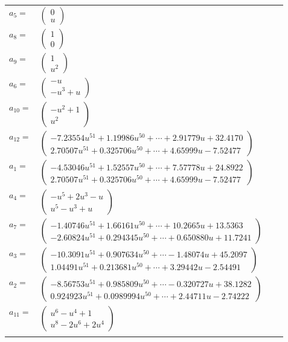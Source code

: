 \documentclass[1p]{elsarticle_modified}
\theoremstyle{definition}
\begin{document}
\begin{tabular}{m{7pt} m{180pt} m{7pt} m{180pt} }
\flushright $a_{5}=$&$\begin{pmatrix}0\\u\end{pmatrix}$ \\
\flushright $a_{8}=$&$\begin{pmatrix}1\\0\end{pmatrix}$ \\
\flushright $a_{9}=$&$\begin{pmatrix}1\\u^2\end{pmatrix}$ \\
\flushright $a_{6}=$&$\begin{pmatrix}- u\\- u^3+u\end{pmatrix}$ \\
\flushright $a_{10}=$&$\begin{pmatrix}- u^2+1\\u^2\end{pmatrix}$ \\
\flushright $a_{12}=$&$\begin{pmatrix}-7.23554 u^{51}+1.19986 u^{50}+\cdots+2.91779 u+32.4170\\2.70507 u^{51}+0.325706 u^{50}+\cdots+4.65999 u-7.52477\end{pmatrix}$ \\
\flushright $a_{1}=$&$\begin{pmatrix}-4.53046 u^{51}+1.52557 u^{50}+\cdots+7.57778 u+24.8922\\2.70507 u^{51}+0.325706 u^{50}+\cdots+4.65999 u-7.52477\end{pmatrix}$ \\
\flushright $a_{4}=$&$\begin{pmatrix}- u^5+2 u^3- u\\u^5- u^3+u\end{pmatrix}$ \\
\flushright $a_{7}=$&$\begin{pmatrix}-1.40746 u^{51}+1.66161 u^{50}+\cdots+10.2665 u+13.5363\\-2.60824 u^{51}+0.294345 u^{50}+\cdots+0.650880 u+11.7241\end{pmatrix}$ \\
\flushright $a_{3}=$&$\begin{pmatrix}-10.3091 u^{51}+0.907634 u^{50}+\cdots-1.48074 u+45.2097\\1.04491 u^{51}+0.213681 u^{50}+\cdots+3.29442 u-2.54491\end{pmatrix}$ \\
\flushright $a_{2}=$&$\begin{pmatrix}-8.56753 u^{51}+0.985809 u^{50}+\cdots-0.320727 u+38.1282\\0.924923 u^{51}+0.0989994 u^{50}+\cdots+2.44711 u-2.74222\end{pmatrix}$ \\
\flushright $a_{11}=$&$\begin{pmatrix}u^6- u^4+1\\u^8-2 u^6+2 u^4\end{pmatrix}$\\&\end{tabular}
\end{document}
